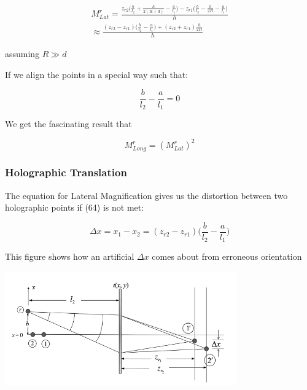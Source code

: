 \documentclass[12pt]{article}
\begin{document}
\begin{equation}
	\begin{multlined}
		M_{Lat}^r = \frac{z_{r2}\bigg( \frac{b}{l_{2}} + \frac{h}{2(R + d)} - \frac{a}{l_{1}}\bigg) - z_{r1}\bigg(\frac{b}{l_{2}} - \frac{h}{2R} - \frac{a}{l_{1}} \bigg)}{h}
		\\\approx \frac{(z_{r2} - z_{r1})\bigg(\frac{b}{l_{2}} -\frac{a}{l_{1}} \bigg) + (z_{r2} + z_{r1})\frac{h}{2R}}{h}
	\end{multlined}
\end{equation}

assuming \(R \gg d\)

If we align the points in a special way such that:

\begin{equation}
	\frac{b}{l_{2}} - \frac{a}{l_{1}} = 0
\end{equation}

We get the fascinating result that

\begin{equation}
	M_{Long}^r = (M_{Lat}^r)^2
\end{equation}

\subsubsection{Holographic Translation}

The equation for Lateral Magnification gives us the distortion between two holographic points if (64) is not met:

\begin{equation}
	\Delta x = x_{1} - x_{2} = (z_{r2} - z_{r1})\bigg(\frac{b}{l_{2}} - \frac{a}{l_{1}}\bigg)
\end{equation}

This figure shows how an artificial \(\Delta x\) comes about from erroneous orientation

\begin{center}
\includegraphics[width=100mm]{tupac13.png}
\end{center}
\end{document}
